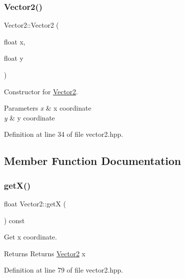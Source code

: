 \subsubsection{\texorpdfstring{Vector2()}{Vector2()}}
{\footnotesize\ttfamily Vector2\+::\+Vector2 (\begin{DoxyParamCaption}\item[{float}]{x,  }\item[{float}]{y }\end{DoxyParamCaption})\hspace{0.3cm}{\ttfamily [inline]}}



Constructor for \mbox{\hyperlink{classVector2}{Vector2}}. 


\begin{DoxyParams}{Parameters}
{\em x} & x coordinate \\
\hline
{\em y} & y coordinate \\
\hline
\end{DoxyParams}


Definition at line 34 of file vector2.\+hpp.



\subsection{Member Function Documentation}
\mbox{\label{classVector2_a808d02062efcc0c016491c04845e3e34}} 
\subsubsection{\texorpdfstring{get\+X()}{getX()}}
{\footnotesize\ttfamily float Vector2\+::getX (\begin{DoxyParamCaption}{ }\end{DoxyParamCaption}) const\hspace{0.3cm}{\ttfamily [inline]}}



Get x coordinate. 

\begin{DoxyReturn}{Returns}
Returns \mbox{\hyperlink{classVector2}{Vector2}} x 
\end{DoxyReturn}


Definition at line 79 of file vector2.\+hpp.

\mbox{\label{classVector2_a59bf838c0fc50305975e1679509fda83}} 
